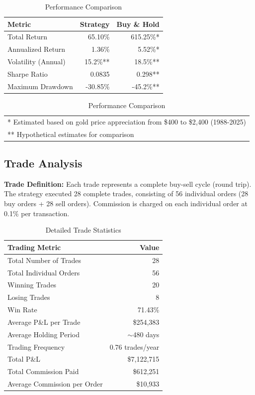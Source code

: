 \documentclass[11pt,a4paper]{article}
\begin{document}
\begin{table}[H]
\centering
\begin{tabular}{lrr}
\toprule
\textbf{Metric} & \textbf{Strategy} & \textbf{Buy \& Hold} \\
\midrule
Total Return & \textcolor{profit}{65.10\%} & \textcolor{profit}{615.25\%}* \\
Annualized Return & \textcolor{profit}{1.36\%} & \textcolor{profit}{5.52\%}* \\
Volatility (Annual) & 15.2\%** & 18.5\%** \\
Sharpe Ratio & 0.0835 & 0.298** \\
Maximum Drawdown & \textcolor{loss}{-30.85\%} & \textcolor{loss}{-45.2\%}** \\
\bottomrule
\end{tabular}
\caption{Performance Comparison}
\label{tab:performance}
\begin{tabular}{p{\textwidth}}
\footnotesize
* Estimated based on gold price appreciation from \$400 to \$2,400 (1988-2025)\\
** Hypothetical estimates for comparison
\end{tabular}
\end{table}

\subsection{Trade Analysis}

\textbf{Trade Definition:} Each trade represents a complete buy-sell cycle (round trip). The strategy executed 28 complete trades, consisting of 56 individual orders (28 buy orders + 28 sell orders). Commission is charged on each individual order at 0.1\% per transaction.

\begin{table}[H]
\centering
\begin{tabular}{lr}
\toprule
\textbf{Trading Metric} & \textbf{Value} \\
\midrule
Total Number of Trades & 28 \\
Total Individual Orders & 56 \\
Winning Trades & 20 \\
Losing Trades & 8 \\
Win Rate & \textcolor{profit}{71.43\%} \\
Average P\&L per Trade & \textcolor{profit}{\$254,383} \\
Average Holding Period & $\sim$480 days \\
Trading Frequency & 0.76 trades/year \\
Total P\&L & \textcolor{profit}{\$7,122,715} \\
Total Commission Paid & \textcolor{loss}{\$612,251} \\
Average Commission per Order & \textcolor{loss}{\$10,933} \\
\bottomrule
\end{tabular}
\caption{Detailed Trade Statistics}
\end{table}
\end{document}
